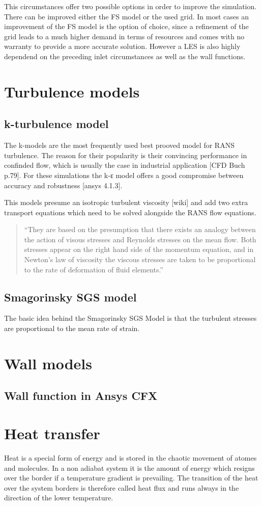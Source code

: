 This circumstances offer two possible options in order to improve the simulation. There can be improved either the FS model or the used grid. In most cases an improvement of the FS model is the option of choice, since a refinement of the grid leads to a much higher demand in terms of resources and comes with no warranty to provide a more accurate solution. However a LES is also highly dependend on the preceding inlet circumstances as well as the wall functions.
\section{Turbulence models}
\subsection{k-\textepsilon turbulence model}
The k-\textepsilon  models are the most frequently used best prooved model for RANS turbulence. The reason for their popularity is their convincing performance in confinded flow, which is usually the case in industrial application [CFD Buch p.79]. For these simulations the k-ε model offers a good compromise between accuracy and robustness [ansys 4.1.3].

This models presume an isotropic turbulent viscosity [wiki] and add two extra transport equations which need to be solved alongside the RANS flow equations.
\begin{quote}
``They are based on the presumption that there exists an analogy between the action of visous stresses and Reynolds stresses on the mean flow. Both stresses appear on the right hand side of the momentum equation, and in Newton’s law of viscosity the viscous stresses are taken to be proportional to the rate of deformation of fluid elements.''
\end{quote}
\subsection{Smagorinsky SGS model}
The basic idea behind the Smagorinsky SGS Model is that the turbulent stresses are proportional to the mean rate of strain.
\section{Wall models}
\subsection{Wall function in Ansys CFX}
\section{Heat transfer}
Heat is a special form of energy and is stored in the chaotic movement of atomes and molecules. In a non adiabat system it is the amount of energy which resigns over the border if a temperature gradient is prevailing. The transition of the heat over the system borders is therefore called heat flux and runs always in the direction of the lower temperature.

